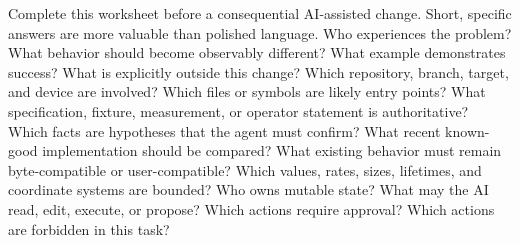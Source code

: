 {}
\markdownRendererSectionEnd 
\markdownRendererSectionEnd \markdownRendererSectionBegin
{}\markdownRendererInterblockSeparator
{}Complete this worksheet before a consequential AI-assisted change. Short,\markdownRendererSoftLineBreak
{}specific answers are more valuable than polished language.\markdownRendererInterblockSeparator
{}\markdownRendererSectionBegin
{}\markdownRendererInterblockSeparator
{}\markdownRendererUlBegin
\markdownRendererUlItem Who experiences the problem?\markdownRendererUlItemEnd 
\markdownRendererUlItem What behavior should become observably different?\markdownRendererUlItemEnd 
\markdownRendererUlItem What example demonstrates success?\markdownRendererUlItemEnd 
\markdownRendererUlItem What is explicitly outside this change?\markdownRendererUlItemEnd 
\markdownRendererUlEnd \markdownRendererInterblockSeparator
{}
\markdownRendererSectionEnd \markdownRendererSectionBegin
{}\markdownRendererInterblockSeparator
{}\markdownRendererUlBegin
\markdownRendererUlItem Which repository, branch, target, and device are involved?\markdownRendererUlItemEnd 
\markdownRendererUlItem Which files or symbols are likely entry points?\markdownRendererUlItemEnd 
\markdownRendererUlItem What specification, fixture, measurement, or operator statement is authoritative?\markdownRendererUlItemEnd 
\markdownRendererUlItem Which facts are hypotheses that the agent must confirm?\markdownRendererUlItemEnd 
\markdownRendererUlItem What recent known-good implementation should be compared?\markdownRendererUlItemEnd 
\markdownRendererUlEnd \markdownRendererInterblockSeparator
{}
\markdownRendererSectionEnd \markdownRendererSectionBegin
{}\markdownRendererInterblockSeparator
{}\markdownRendererUlBegin
\markdownRendererUlItem What existing behavior must remain byte-compatible or user-compatible?\markdownRendererUlItemEnd 
\markdownRendererUlItem Which values, rates, sizes, lifetimes, and coordinate systems are bounded?\markdownRendererUlItemEnd 
\markdownRendererUlItem Who owns mutable state?\markdownRendererUlItemEnd 
\markdownRendererUlItem What may the AI read, edit, execute, or propose?\markdownRendererUlItemEnd 
\markdownRendererUlItem Which actions require approval?\markdownRendererUlItemEnd 
\markdownRendererUlItem Which actions are forbidden in this task?\markdownRendererUlItemEnd 
\markdownRendererUlEnd \markdownRendererInterblockSeparator
{}
\markdownRendererSectionEnd \markdownRendererSectionBegin
